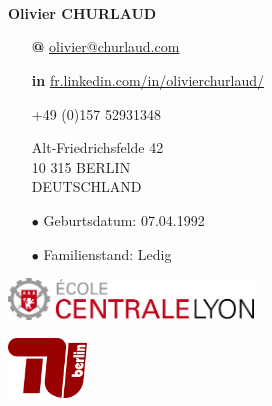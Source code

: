 \documentclass[skip,a4paper]{article}
\begin{document}
\fontsize{8.5}{9.5}
\selectfont

\begin{minipage}[c]{\linewidth}
	\begin{minipage}[c][4cm]{2.6cm}
		~\\~\\
		\vfill
		~
	\end{minipage}
	\begin{minipage}[c][4cm]{5.5cm}
		\textbf{Olivier CHURLAUD}

		\begin{itemize}[itemsep=0.5ex,leftmargin=3ex]
			\footnotesize
			\item[\bfseries @] \url{olivier@churlaud.com}
			\item[\bfseries \color{blue} in] {\scriptsize\url{ fr.linkedin.com/in/olivierchurlaud/}}
			\item[\Telefon]+49 (0)157 52931348
			\item[\Letter] Alt-Friedrichsfelde 42 \\
			10 315 BERLIN \\ 
			DEUTSCHLAND
			\item[$\bullet$] Geburtsdatum: 07.04.1992
			\itemsep -2pt
			\item[$\bullet$] Familienstand: Ledig

		\end{itemize}
	\end{minipage}
	\begin{minipage}[c][4cm]{10cm}
		\begin{minipage}[c]{7.10cm}
			\includegraphics[width=6.5cm]{img/ecl}
		\end{minipage}
		\hfill
		\begin{minipage}[c]{2.5cm}
			\includegraphics[width=2.1cm]{img/tuberlin}
		\end{minipage}
		

\end{minipage}
\end{minipage}
\end{document}
